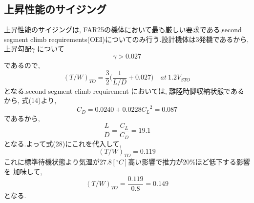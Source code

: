 \documentclass[../main]{subfiles}
\begin{document}
  \subsection{上昇性能のサイジング}
    上昇性能のサイジングは, FAR25の機体において最も厳しい要求である,second segment climb
    requirements(OEI)についてのみ行う.設計機体は3発機であるから,上昇勾配$\gamma$
    について
    \begin{equation}
      \gamma > 0.027
    \end{equation}
    であるので,
    \begin{equation}
      {(T/W)}_{TO} = \frac{3}{2} \biggl( \frac{1}{L/D} + 0.027 \biggr) \quad at \ 1.2V_{STO}
    \end{equation}
    となる.second segment climb requirement においては, 離陸時脚収納状態であるから,
    式(14)より,
    \begin{equation}
      C_D = 0.0240 + 0.0228 {C_L}^2 = 0.087
    \end{equation}
    であるから,
    \begin{equation}
      \frac{L}{D} = \frac{C_L}{C_D} = 19.1
    \end{equation}
    となる.よって式(28)にこれを代入して,
    \begin{equation}
      {(T/W)}_{TO} = 0.119
    \end{equation}
    これに標準待機状態より気温が$27.8[^\circ C]$高い影響で推力が$20\%$ほど低下する影響を
    加味して,
    \begin{equation}
      {(T/W)}_{TO} = \frac{0.119}{0.8} = 0.149
    \end{equation}
    となる.
\end{document}
